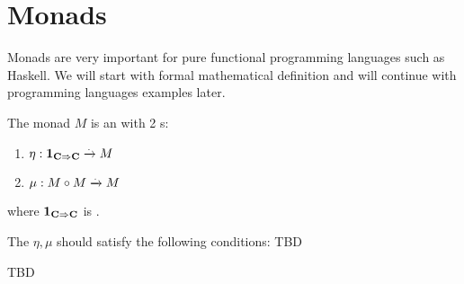 \chapter{Monads}

Monads are very important for pure functional programming languages
such as Haskell. We will start with formal mathematical definition and
will continue with programming languages examples later.

\begin{definition}[Monad]
  \label{def:monad}
  The monad $M$ is an  with 2
  s:
  \begin{enumerate}
  \item $\eta: \mathbf{1}_{ \mathbf{C} \Rightarrow \mathbf{C} } \xrightarrow{.} M$
  \item $\mu: M \circ M \xrightarrow{.} M$
  \end{enumerate}
  where $\mathbf{1}_{ \mathbf{C} \Rightarrow \mathbf{C} }$ is .

  The $\eta, \mu$ should satisfy the following conditions:
  TBD
\end{definition}




TBD
